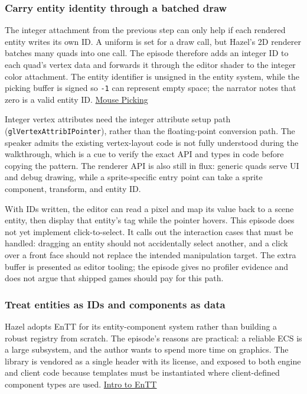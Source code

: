 \subsubsection{Carry entity identity through a batched draw}\label{carry-entity-identity-through-a-batched-draw}

The integer attachment from the previous step can only help if each rendered entity writes its own ID. A uniform is set for a draw call, but Hazel's 2D renderer batches many quads into one call. The episode therefore adds an integer ID to each quad's vertex data and forwards it through the editor shader to the integer color attachment. The entity identifier is unsigned in the entity system, while the picking buffer is signed so \texttt{-1} can represent empty space; the narrator notes that zero is a valid entity ID. \href{https://www.youtube.com/watch?v=GKERbQ7Sqyg}{Mouse Picking}

Integer vertex attributes need the integer attribute setup path (\texttt{glVertexAttribIPointer}), rather than the floating-point conversion path. The speaker admits the existing vertex-layout code is not fully understood during the walkthrough, which is a cue to verify the exact API and types in code before copying the pattern. The renderer API is also still in flux: generic quads serve UI and debug drawing, while a sprite-specific entry point can take a sprite component, transform, and entity ID.

With IDs written, the editor can read a pixel and map its value back to a scene entity, then display that entity's tag while the pointer hovers. This episode does not yet implement click-to-select. It calls out the interaction cases that must be handled: dragging an entity should not accidentally select another, and a click over a front face should not replace the intended manipulation target. The extra buffer is presented as editor tooling; the episode gives no profiler evidence and does not argue that shipped games should pay for this path.

\subsubsection{Treat entities as IDs and components as data}\label{treat-entities-as-ids-and-components-as-data}

Hazel adopts EnTT for its entity-component system rather than building a robust registry from scratch. The episode's reasons are practical: a reliable ECS is a large subsystem, and the author wants to spend more time on graphics. The library is vendored as a single header with its license, and exposed to both engine and client code because templates must be instantiated where client-defined component types are used. \href{https://www.youtube.com/watch?v=D4hz0wEB978}{Intro to EnTT}

